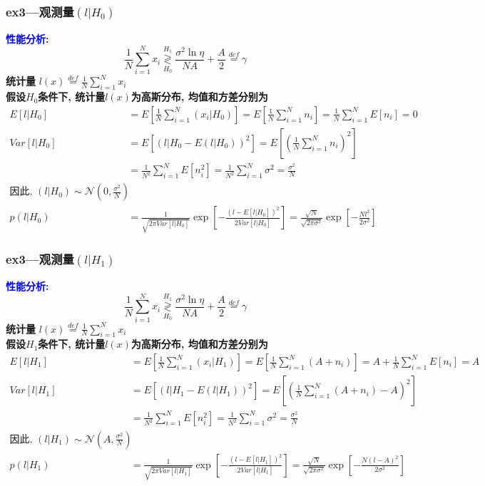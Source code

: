 \begin{frame}[shrink]
\frametitle{ex3---观测量$(l|H_0)$}
\textcolor{blue}{\textbf{性能分析:}}
\[
\frac{1}{N}\sum\limits_{i=1}^{N}x_i\mathop{\gtrless}\limits_{H_0}^{H_1}\frac{\sigma^2\ln\eta}{NA}+\frac{A}{2}\mathop{=}\limits^{def}\gamma
\]
\textbf{统计量  }\qquad $l(x)\mathop{=}\limits^{def}\frac{1}{N}\sum\limits_{i=1}^{N}x_i$\\
\textbf{假设$H_0$条件下, 统计量$l(x)$为高斯分布, 均值和方差分别为}
\begin{align*}
E[l|H_0]&=E\left[\frac{1}{N}\sum\limits_{i=1}^{N}(x_i|H_0)\right]=E\left[\frac{1}{N}\sum\limits_{i=1}^{N}n_i\right]=\frac{1}{N}\sum\limits_{i=1}^{N}E[n_i]=0\\
Var[l|H_0]&=E\left[(l|H_0-E(l|H_0))^2\right]=E\left[\left(\frac{1}{N}\sum\limits_{i=1}^{N}n_i\right)^2\right]\\
&=\frac{1}{N^2}\sum\limits_{i=1}^{N}E[n_i^2]=\frac{1}{N^2}\sum\limits_{i=1}^{N}\sigma^2=\frac{\sigma^2}{N}\\
\textbf{因此, }(l|H_0)\sim\mathcal{N}(0,\frac{\sigma^2}{N})\\
p(l|H_0)&=\frac{1}{\sqrt{2\pi Var[l|H_0]}}\exp\left[-\frac{(l-E[l|H_0])^2}{2 Var[l|H_0]}\right]=\frac{\sqrt{N}}{\sqrt{2\pi\sigma^2}}\exp\left[-\frac{Nl^2}{2\sigma^2}\right]
\end{align*}
\end{frame}

\begin{frame}[shrink]
\frametitle{ex3---观测量$(l|H_1)$}
\textcolor{blue}{\textbf{性能分析:}}
\[
\frac{1}{N}\sum\limits_{i=1}^{N}x_i\mathop{\gtrless}\limits_{H_0}^{H_1}\frac{\sigma^2\ln\eta}{NA}+\frac{A}{2}\mathop{=}\limits^{def}\gamma
\]
\textbf{统计量  }\qquad $l(x)\mathop{=}\limits^{def}\frac{1}{N}\sum\limits_{i=1}^{N}x_i$\\
\textbf{假设$H_1$条件下, 统计量$l(x)$为高斯分布, 均值和方差分别为}
\begin{align*}
E[l|H_1]&=E\left[\frac{1}{N}\sum\limits_{i=1}^{N}(x_i|H_1)\right]=E\left[\frac{1}{N}\sum\limits_{i=1}^{N}(A+n_i)\right]=A+\frac{1}{N}\sum\limits_{i=1}^{N}E[n_i]=A\\
Var[l|H_1]&=E\left[(l|H_1-E(l|H_1))^2\right]=E\left[\left(\frac{1}{N}\sum\limits_{i=1}^{N}(A+n_i)-A\right)^2\right]\\
&=\frac{1}{N^2}\sum\limits_{i=1}^{N}E[n_i^2]=\frac{1}{N^2}\sum\limits_{i=1}^{N}\sigma^2=\frac{\sigma^2}{N}\\
\textbf{因此, }(l|H_1)\sim\mathcal{N}(A,\frac{\sigma^2}{N})\\
p(l|H_1)&=\frac{1}{\sqrt{2\pi Var[l|H_1]}}\exp\left[-\frac{(l-E[l|H_1])^2}{2 Var[l|H_1]}\right]=\frac{\sqrt{N}}{\sqrt{2\pi\sigma^2}}\exp\left[-\frac{N(l-A)^2}{2\sigma^2}\right]
\end{align*}
\end{frame}


